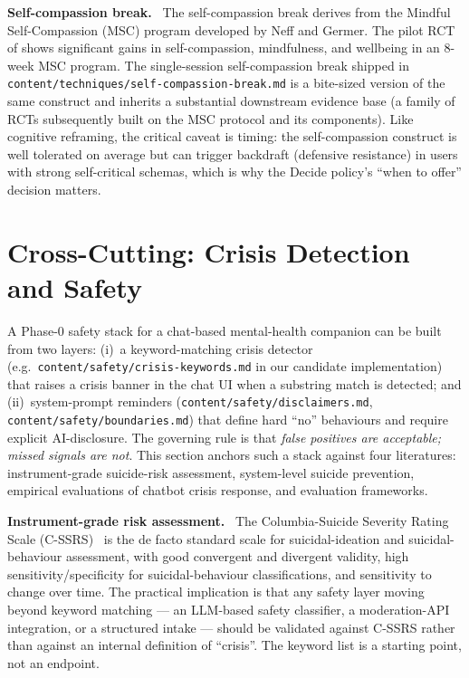 \documentclass[10pt,conference]{article}
\renewcommand{\paragraph}[1]{\smallskip\par\noindent\textbf{#1}~\ignorespaces}
\begin{document}
\paragraph{Self-compassion break.}
The self-compassion break derives from the Mindful Self-Compassion
(MSC) program developed by Neff and Germer. The pilot RCT of
\cite{NeffGermer2013MSC} shows significant gains in self-compassion,
mindfulness, and wellbeing in an 8-week MSC program. The
single-session self-compassion break shipped in
\texttt{content/techniques/self-compassion-break.md} is a
bite-sized version of the same construct and inherits a substantial
downstream evidence base (a family of RCTs subsequently built on the
MSC protocol and its components). Like cognitive reframing, the
critical caveat is timing: the self-compassion construct is well
tolerated on average but can trigger backdraft (defensive resistance)
in users with strong self-critical schemas, which is why the Decide
policy's ``when to offer'' decision matters.

\section{Cross-Cutting: Crisis Detection and Safety}\label{sec:safety}

A Phase-0 safety stack for a chat-based mental-health companion can
be built from two layers: (i)~a keyword-matching crisis detector
(e.g.\ \texttt{content/safety/crisis-keywords.md} in our candidate
implementation) that raises a crisis banner in the chat UI when a
substring match is detected; and (ii)~system-prompt reminders
(\texttt{content/safety/disclaimers.md}, \texttt{content/safety/boundaries.md})
that define hard ``no'' behaviours and require explicit AI-disclosure.
The governing rule is that \emph{false positives are acceptable;
missed signals are not}. This section anchors such a stack against
four literatures: instrument-grade suicide-risk assessment,
system-level suicide prevention, empirical evaluations of chatbot
crisis response, and evaluation frameworks.

\paragraph{Instrument-grade risk assessment.}
The Columbia-Suicide Severity Rating Scale
(C-SSRS)~\cite{Posner2011CSSRS} is the de facto standard scale for
suicidal-ideation and suicidal-behaviour assessment, with good
convergent and divergent validity, high sensitivity/specificity for
suicidal-behaviour classifications, and sensitivity to change over
time. The practical implication is that any safety layer moving beyond
keyword matching --- an LLM-based safety classifier, a moderation-API
integration, or a structured intake --- should be validated against
C-SSRS rather than against an internal definition of ``crisis''. The
keyword list is a starting point, not an endpoint.
\end{document}
